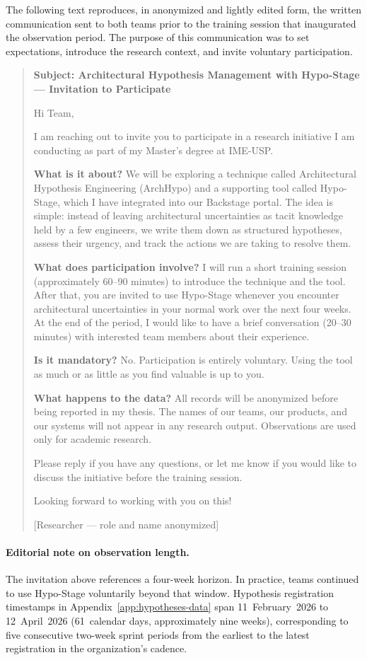 The following text reproduces, in anonymized and lightly edited form, the
written communication sent to both teams prior to the training session that
inaugurated the observation period. The purpose of this communication was to
set expectations, introduce the research context, and invite voluntary
participation.

\begin{quote}
\textbf{Subject: Architectural Hypothesis Management with Hypo-Stage ---
Invitation to Participate}

Hi Team,

I am reaching out to invite you to participate in a research initiative I am
conducting as part of my Master's degree at IME-USP.

\textbf{What is it about?}
We will be exploring a technique called Architectural Hypothesis Engineering
(ArchHypo) and a supporting tool called Hypo-Stage, which I have integrated
into our Backstage portal. The idea is simple: instead of leaving
architectural uncertainties as tacit knowledge held by a few engineers, we
write them down as structured hypotheses, assess their urgency, and track
the actions we are taking to resolve them.

\textbf{What does participation involve?}
I will run a short training session (approximately 60--90 minutes) to introduce
the technique and the tool. After that, you are invited to use Hypo-Stage
whenever you encounter architectural uncertainties in your normal work over
the next four weeks. At the end of the period, I would like to have a brief
conversation (20--30 minutes) with interested team members about their
experience.

\textbf{Is it mandatory?}
No. Participation is entirely voluntary. Using the tool as much or as little
as you find valuable is up to you.

\textbf{What happens to the data?}
All records will be anonymized before being reported in my thesis. The names
of our teams, our products, and our systems will not appear in any research
output. Observations are used only for academic research.

Please reply if you have any questions, or let me know if you would like to
discuss the initiative before the training session.

Looking forward to working with you on this!

[Researcher --- role and name anonymized]
\end{quote}

\paragraph{Editorial note on observation length.}
The invitation above references a four-week horizon. In practice, teams continued to use Hypo-Stage voluntarily beyond that window. Hypothesis registration timestamps in Appendix~\ref{app:hypotheses-data} span 11~February~2026 to 12~April~2026 (61~calendar days, approximately nine weeks), corresponding to five consecutive two-week sprint periods from the earliest to the latest registration in the organization's cadence.
